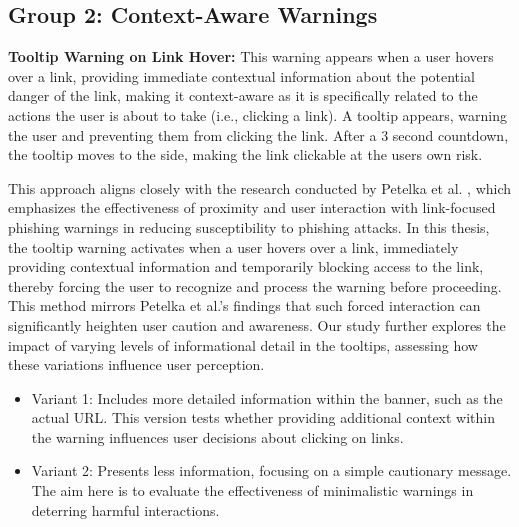 \documentclass[
  a4paper,  %
  twoside,  %
  bibliography=totoc,
  headsepline,
  cleardoublepage=empty,
  parskip=half,
  draft=false
]{scrbook}
\begin{document}
\subsection{Group 2: Context-Aware Warnings}

\textbf{Tooltip Warning on Link Hover:} This warning appears when a user hovers over a link, providing immediate contextual information about the potential danger of the link, making it context-aware as it is specifically related to the actions the user is about to take (i.e., clicking a link). A tooltip appears, warning the user and preventing them from clicking the link. After a 3 second countdown, the tooltip moves to the side, making the link clickable at the users own risk. 

This approach aligns closely with the research conducted by Petelka et al. \cite{petelka}, which emphasizes the effectiveness of proximity and user interaction with link-focused phishing warnings in reducing susceptibility to phishing attacks. In this thesis, the tooltip warning activates when a user hovers over a link, immediately providing contextual information and temporarily blocking access to the link, thereby forcing the user to recognize and process the warning before proceeding. This method mirrors Petelka et al.'s findings that such forced interaction can significantly heighten user caution and awareness. Our study further explores the impact of varying levels of informational detail in the tooltips, assessing how these variations influence user perception.

\begin{itemize}
    \item Variant 1: Includes more detailed information within the banner, such as the actual URL. This version tests whether providing additional context within the warning influences user decisions about clicking on links.
    \item Variant 2: Presents less information, focusing on a simple cautionary message. The aim here is to evaluate the effectiveness of minimalistic warnings in deterring harmful interactions.
\end{itemize}
\end{document}
